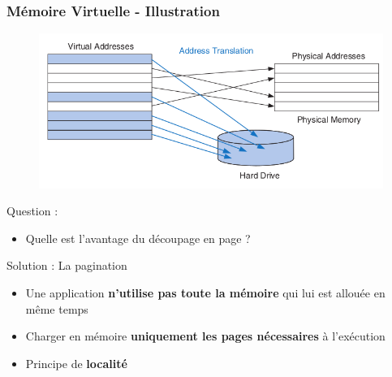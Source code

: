 \documentclass[8pt]{beamer}
\begin{document}
\begin{frame}[c]
    \frametitle{Mémoire Virtuelle - Illustration}
    \begin{figure}
        \centering
        \includegraphics[width=.5\textwidth]{figures/vir.png}
    \end{figure}
    \begin{alertblock}{Question : }
        \begin{itemize}
            \item
                  Quelle est l'avantage du d\'ecoupage en page ?
        \end{itemize}
    \end{alertblock}
    \pause
    \begin{exampleblock}{Solution : La pagination}
        \begin{itemize}
            \item Une application \textbf{n'utilise pas toute la mémoire} qui
                  lui est
                  allouée en même
                  temps
            \item Charger en mémoire \textbf{uniquement les pages nécessaires}
                  à
                  l'exécution
            \item Principe de \textbf{localité}
        \end{itemize}
    \end{exampleblock}

\end{frame}
\end{document}
